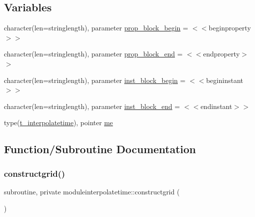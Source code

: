 \subsection*{Variables}
\begin{DoxyCompactItemize}
\item 
character(len=stringlength), parameter \mbox{\hyperlink{namespacemoduleinterpolatetime_a457f0bd08ea2d1cd3c378cb5b134579b}{prop\+\_\+block\+\_\+begin}} = \textquotesingle{}$<$$<$beginproperty$>$$>$\textquotesingle{}
\item 
character(len=stringlength), parameter \mbox{\hyperlink{namespacemoduleinterpolatetime_aa46f26d9551bfc9f0e94e17fbdd10df0}{prop\+\_\+block\+\_\+end}} = \textquotesingle{}$<$$<$endproperty$>$$>$\textquotesingle{}
\item 
character(len=stringlength), parameter \mbox{\hyperlink{namespacemoduleinterpolatetime_a899819c24884a5d5e96cfb388deebf35}{inst\+\_\+block\+\_\+begin}} = \textquotesingle{}$<$$<$begininstant$>$$>$\textquotesingle{}
\item 
character(len=stringlength), parameter \mbox{\hyperlink{namespacemoduleinterpolatetime_a99b92f084d4e9d7ca5333ecb86693dc8}{inst\+\_\+block\+\_\+end}} = \textquotesingle{}$<$$<$endinstant$>$$>$\textquotesingle{}
\item 
type(\mbox{\hyperlink{structmoduleinterpolatetime_1_1t__interpolatetime}{t\+\_\+interpolatetime}}), pointer \mbox{\hyperlink{namespacemoduleinterpolatetime_a4f11cedfc0e20d3f4435756c364ad041}{me}}
\end{DoxyCompactItemize}


\subsection{Function/\+Subroutine Documentation}
\mbox{\label{namespacemoduleinterpolatetime_ae85e58c7f2328078eb15ab901ab2cec2}} 
\subsubsection{\texorpdfstring{constructgrid()}{constructgrid()}}
{\footnotesize\ttfamily subroutine, private moduleinterpolatetime\+::constructgrid (\begin{DoxyParamCaption}{ }\end{DoxyParamCaption})\hspace{0.3cm}{\ttfamily [private]}}

